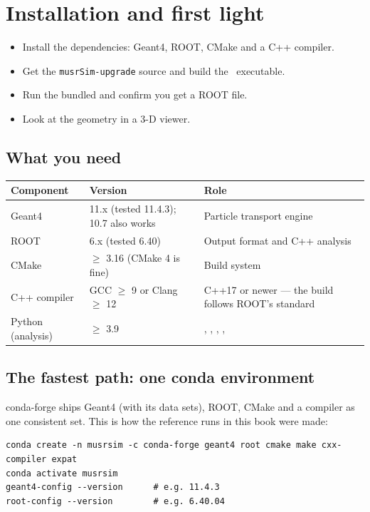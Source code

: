 \chapter{Installation and first light}
\label{ch:install}

\begin{willdo}
\begin{itemize}
  \item Install the dependencies: Geant4, ROOT, CMake and a C++ compiler.
  \item Get the \texttt{musrSim-upgrade} source and build the \musrSim\ executable.
  \item Run the bundled  and confirm you get a ROOT file.
  \item Look at the geometry in a 3-D viewer.
\end{itemize}
\end{willdo}

\section{What you need}
{\tablestyle
\begin{tabularx}{\textwidth}{@{}l l L@{}}
\toprule
\textbf{Component} & \textbf{Version} & \textbf{Role}\\
\midrule
Geant4 & 11.x (tested 11.4.3); 10.7 also works & Particle transport engine \\
ROOT & 6.x (tested 6.40) & Output format and C++ analysis \\
CMake & \(\ge\) 3.16 (CMake 4 is fine) & Build system \\
C++ compiler & GCC \(\ge\) 9 or Clang \(\ge\) 12 & C++17 or newer --- the build follows ROOT's standard \\
Python (analysis) & \(\ge\) 3.9 & , , , ,  \\
\bottomrule
\end{tabularx}}

\section{The fastest path: one conda environment}
\label{sec:conda}
conda-forge ships Geant4 (with its data sets), ROOT, CMake and a compiler as one consistent set. This is how the reference runs in this book were made:

\begin{lstlisting}[style=sh,caption={Geant4 + ROOT + toolchain from conda-forge (use \texttt{mamba} or \texttt{micromamba} the same way)}]
conda create -n musrsim -c conda-forge geant4 root cmake make cxx-compiler expat
conda activate musrsim
geant4-config --version      # e.g. 11.4.3
root-config --version        # e.g. 6.40.04
\end{lstlisting}

